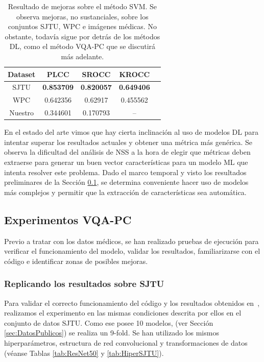 \begin{table}[htp]
  \scriptsize
  \begin{center}
    \begin{tabular}[c]{|c|c|c|c|c|}
      \hline
      \rowcolor[HTML]{FFC702}
      \textbf{Dataset} & \textbf{PLCC} & \textbf{SROCC} & \textbf{KROCC} \\ 
      \hline
      SJTU & \textbf{0.853709} & \textbf{0.820057} & \textbf{0.649406} \\ 
      \hline 
      WPC & 0.642356 & 0.62917 & 0.455562 \\
      \hline 
      Nuestro & 0.344601 &  0.170793 & -- \\
      \hline
    \end{tabular}
  \end{center}
  \caption[Resultado de mejoras sobre el método SVM]{Resultado de mejoras sobre el método SVM.
   Se observa mejoras, no sustanciales, sobre los conjuntos SJTU, WPC e imágenes médicas.
   No obstante, todavía sigue por detrás de los métodos DL, como el método VQA-PC 
   que se discutirá más adelante.
  }
  \label{tab:ImprovNR3DQA}
\end{table}

En el estado del arte vimos que hay cierta inclinación al uso de modelos 
DL para intentar superar los resultados actuales y obtener una métrica más 
genérica. Se observa la dificultad del análisis de NSS a la hora de elegir que métricas 
deben extraerse para generar un buen vector características para un modelo ML 
que intenta resolver este problema. Dado el marco temporal y visto los 
resultados preliminares de la Sección \ref{sec:PreResults}, se determina 
conveniente hacer uso de modelos más complejos y permitir que la extracción 
de características sea automática. 

\subsection{Experimentos VQA-PC}
\label{sec:PreResults}
Previo a tratar con los datos médicos, se han realizado pruebas de ejecución 
para verificar el funcionamiento del modelo, validar los resultados, familiarizarse 
con el código e identificar zonas de posibles mejoras.

\subsubsection{Replicando los resultados sobre SJTU}
\label{sec:VQAPCSJTU}
Para validar el correcto funcionamiento del código y los resultados obtenidos 
en~\cite{VQA-PC}, realizamos el experimento en las mismas condiciones descrita 
por ellos en el conjunto de datos SJTU. Como ese posee 10 modelos, 
(ver Sección \ref{sec:DatosPublicos}) se realiza un 9-fold. Se han utilizado 
los mismos hiperparámetros, estructura de red convolucional y transformaciones 
de datos (véanse Tablas \ref{tab:ResNet50} y \ref{tab:HiperSJTU}). 

